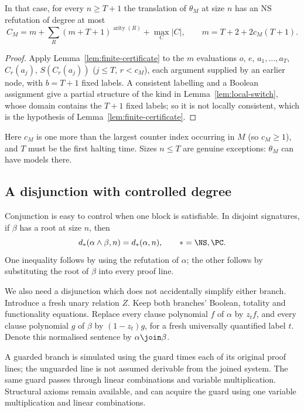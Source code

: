 \begin{corollary}\label{cor:switch-degree}
In that case, for every $n\ge T+1$ the translation of $\theta_M$ at size $n$ has an NS refutation
of degree at most
\[
 C_M=m+\sum_R(m+T+1)^{\operatorname{arity}(R)}+\max_{C}|C|,\qquad m=T+2+2c_M(T+1).
\]
\end{corollary}
\begin{proof}
Apply Lemma~\ref{lem:finite-certificate} to the $m$ evaluations $o$, $e$, $a_1,\ldots,a_T$,
$C_r(a_j)$, $S(C_r(a_j))$ ($j\le T$, $r<c_M$), each argument supplied by an earlier node, with
$b=T+1$ fixed labels. A consistent labelling and a Boolean assignment give a partial structure of
the kind in Lemma~\ref{lem:local-switch}, whose domain contains the $T+1$ fixed labels; so it is not
locally consistent, which is the hypothesis of Lemma~\ref{lem:finite-certificate}.
\end{proof}

Here $c_M$ is one more than the largest counter index occurring in $M$ (so $c_M\ge1$), and $T$ must be
the first halting time. Sizes $n\le T$ are genuine exceptions: $\theta_M$ can have models there.

\subsection{A disjunction with controlled degree}
Conjunction is easy to control when one block is satisfiable. In disjoint
signatures, if $\beta$ has a root at size $n$, then
\begin{equation}\label{eq:satisfiable-block}
 d_*(\alpha\wedge\beta,n)=d_*(\alpha,n),
 \qquad *=\NS,\PC.
\end{equation}
One inequality follows by using the refutation of $\alpha$; the other
follows by substituting the root of $\beta$ into every proof line.

We also need a disjunction which does not accidentally simplify either
branch. Introduce a fresh unary relation $Z$. Keep both branches' Boolean,
totality and functionality equations. Replace every clause polynomial $f$
of $\alpha$ by $z_t f$, and every clause polynomial $g$ of $\beta$ by
$(1-z_t)g$, for a fresh universally quantified label $t$. Denote this
normalised sentence by $\alpha\join\beta$.

A guarded branch is simulated using the guard times each of its
original proof lines; the unguarded line is not assumed derivable
from the joined system. The same guard passes through linear
combinations and variable multiplication. Structural axioms remain
available, and can acquire the guard using one variable multiplication
and linear combinations.

